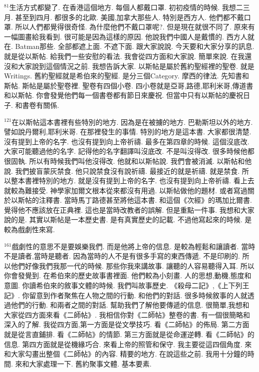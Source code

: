 \documentclass{book}
\begin{document}
$^{81}$生活方式都變了.
在香港這個地方.
每個人都戴口罩.
初初疫情的時候.
我想二三月.
甚至到四月.
都很多的北歐.
美國,加拿大那些人.
特別是西方人.
他們都不戴口罩.
所以人們都覺得很奇怪.
為什麼他們不戴口罩呢?.
但是現在就很不同了.
原來有一幅圖畫給我看到.
很可能是因為這樣的原因.
他說我們中國人是戴慣的.
西方人就在.
Batman那些.
全部都遮上面.
不遮下面.
跟大家說說.
今天要和大家分享的訊息.
就是從以斯帖.
給我們一些安慰的看法.
我會從四方面和大家說.
簡單來說.
在我還沒和大家說到這個情況之前.
我想告訴大家.
以斯帖是屬於舊約聖經裡的聖卷.
就是Writings.
舊約聖經就是希伯來的聖經.
是分三個Category.
摩西的律法.
先知書和斯帖.
斯帖是屬於聖卷裡.
聖卷有四個小卷.
四小卷就是亞哥,路德,耶利米哥,傳道書和以斯帖.
你會發覺他們每一個書卷都有節日來慶祝.
但當中只有以斯帖的慶祝日子.
和書卷有關係.

$^{121}$在以斯帖這本書裡有些特別的地方.
因為是在被擄的地方.
巴勒斯坦以外的地方.
譬如說丹爾利,耶利米哥.
在那裡發生的事情.
特別的地方是這本書.
大家都很清楚.
沒有提到上帝的名字.
也沒有提到向上帝祈禱.
最多在第四章的時候.
這個沒底改.
大家可能聽過他的名字.
記得他的名字翻譯叫沒底改.
不是叫沒得改.
很多時候他都很固執.
所以有時候我們叫他沒得改.
他就和以斯帖說.
我們會被消滅.
以斯帖和他說.
我們披盲蒙灰禁食.
他只說禁食沒有說祈禱.
最接近的就是祈禱.
就是禁食.
所以整本書裡特別的地方.
就是沒有提到上帝的名字.
也沒有提到向上帝祈禱.
看上去就較為難接受.
神學家加爾文根本從來都沒有用過.
以斯帖做他的題材.
或者寫過關於以斯帖的注釋書.
當時馬丁路德甚至將他這本書.
和這個《次經》的瑪加比爾書.
覺得他不應該放在正典裡.
這也是當時改教者的誤解.
但是重點一件事.
我想和大家說的是.
其實以斯帖是一本歷史書.
是有真實歷史的記載.
不過他寫起來的時候.
是較為戲劇性來寫.

$^{161}$戲劇性的意思不是要娛樂我們.
而是他將上帝的信息.
是較為輕鬆和讓讀者.
當時不是讀者,當時是聽者.
因為當時的人不是有很多手寫的東西傳遞.
不是印刷的.
所以他們好像我們我那一代的時候.
那些你我來講故事.
讓聽的人容易聽得入耳.
所以你會發覺到.
在希伯來的歷史故事書裡面.
他們較為小刻畫.
人的思想,動機,態度和意圖.
你讀希伯來的敘事文體的時候.
我們叫故事歷史.
《殺母二記》,《上下列王記》.
你留意到作者聚焦在人物之間的行動.
和他們的對話.
很多時候敘事的人就透過他們的行動.
和兩者之間的對話.
幫助我們了解他要傳遞的信息.
很簡單,我想和大家從四方面來看《二師帖》.
我相信你對《二師帖》整卷的書.
有一個很簡略和深入的了解.
我從四方面,第一方面是從文學技巧.
看《二師帖》的佈局.
第二方面就是從言直鋪排.
看《二師帖》的情節.
第三方面就是從命運逆轉.
看《二師帖》的信息.
第四方面就是從機緣巧合.
來看上帝的照管和保守.
我主要從這四個角度.
來和大家勾畫出整個《二師帖》的內容.
精要的地方.
在說這些之前.
我用十分鐘的時間.
來和大家處理一下.
舊約聚事文體.
基本要素.
\end{document}
